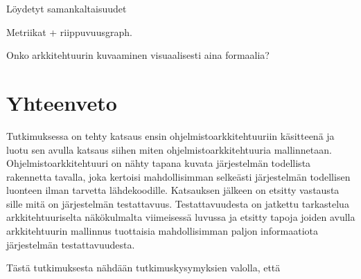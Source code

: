 \documentclass[finnish]{tktltiki2}
\numberwithin{table}{section}
\theoremstyle{definition}
\theoremstyle{remark}
\begin{document}
Löydetyt samankaltaisuudet

Metriikat + riippuvuusgraph.

Onko arkkitehtuurin kuvaaminen visuaalisesti aina formaalia?


\newpage

\section{Yhteenveto}

Tutkimuksessa on tehty katsaus ensin ohjelmistoarkkitehtuuriin käsitteenä ja luotu sen avulla katsaus siihen miten ohjelmistoarkkitehtuuria mallinnetaan. Ohjelmistoarkkitehtuuri on nähty tapana kuvata järjestelmän todellista rakennetta tavalla, joka kertoisi mahdollisimman selkeästi järjestelmän todellisen luonteen ilman tarvetta lähdekoodille. Katsauksen jälkeen on etsitty vastausta sille mitä on järjestelmän testattavuus. Testattavuudesta on jatkettu tarkastelua arkkitehtuuriselta näkökulmalta viimeisessä luvussa ja etsitty tapoja joiden avulla arkkitehtuurin mallinnus tuottaisia mahdollisimman paljon informaatiota järjestelmän testattavuudesta.

Tästä tutkimuksesta nähdään tutkimuskysymyksien valolla, että

\newpage



%
%
% 
%

%






% 
\end{document}
